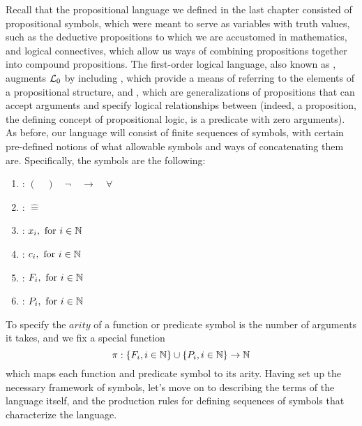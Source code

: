 \documentclass{article}
\begin{document}
Recall that the propositional language we defined in the last chapter consisted of propositional symbols, which were meant to serve as variables with truth values, such as the deductive propositions to which we are accustomed in mathematics, and logical connectives, which allow us ways of combining propositions together into compound propositions. The first-order logical language, also known as , augments $ \mathcal{L}_0 $ by including , which provide a means of referring to the elements of a propositional structure, and , which are generalizations of propositions that can accept arguments and specify logical relationships between  (indeed, a proposition, the defining concept of propositional logic, is a predicate with zero arguments).
\nn
As before, our language will consist of finite sequences of symbols, with certain pre-defined notions of what allowable symbols and ways of concatenating them are. Specifically, the symbols are the following:
\begin{enumerate}
    \item {}: $ ( \quad ) \quad \neg \quad \rightarrow \quad \forall $
    \item {}: $ \hat{=} $
    \item {}: $ x_i, \text{ for } i \in \mathbb{N} $
    \item {}: $ c_i, \text{ for } i \in \mathbb{N} $
    \item {}: $ F_i, \text{ for } i \in \mathbb{N} $
    \item {}: $ P_i, \text{ for  } i \in \mathbb{N} $
\end{enumerate}
\n
To specify the $ arity $ of a function or predicate symbol is the number of arguments it takes, and we fix a special function 
    $$ \pi: \{ F_i, i \in \mathbb{N} \} \cup \{ P_i, i \in \mathbb{N} \} \rightarrow \mathbb{N} $$
which maps each function and predicate symbol to its arity. Having set up the necessary framework of symbols, let's move on to describing the terms of the language itself, and the production rules for defining sequences of symbols that characterize the language.
\end{document}
